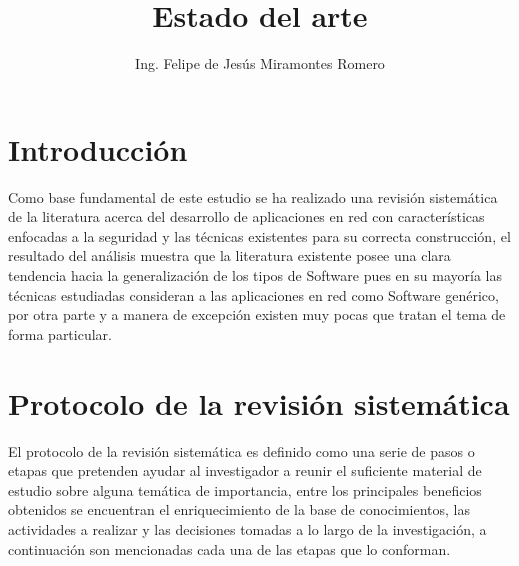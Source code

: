 \documentclass[runningheads,a4paper]{llncs}
\begin{document}
\mainmatter  
\title{Estado del arte}
\author{Ing. Felipe de Jesús Miramontes Romero}
\maketitle

\section{Introducción}
Como base fundamental de este estudio se ha realizado una revisión sistemática de la literatura acerca del desarrollo de aplicaciones en red con características enfocadas a la seguridad y las técnicas existentes para su correcta construcción, el resultado del análisis muestra que la literatura existente posee una clara tendencia hacia la generalización de los tipos de \gls{Software} pues en su mayoría las técnicas estudiadas consideran a las aplicaciones en red como \gls{Software} genérico, por otra parte y a manera de excepción existen muy pocas que tratan el tema de forma particular.

\section{Protocolo de la revisión sistemática}
El protocolo de la revisión sistemática es definido como una serie de pasos o etapas que pretenden ayudar al investigador a reunir el suficiente material de estudio sobre alguna temática de importancia, entre los principales beneficios obtenidos se encuentran el enriquecimiento de la base de conocimientos, las actividades a realizar y las decisiones tomadas a lo largo de la investigación, a continuación son mencionadas cada una de las etapas que lo conforman.
\end{document}
